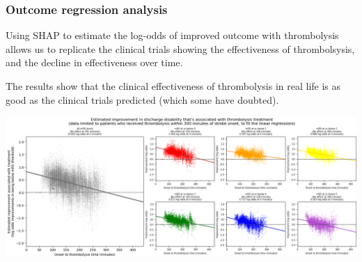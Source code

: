 \begin{frame}
\frametitle{Outcome regression analysis}

Using SHAP to estimate the log-odds of improved outcome with thrombolysis allows us to replicate the clinical trials showing the effectiveness of thrombolsysis, and the decline in effectiveness over time.

\vspace{2mm}

The results show that the clinical effectiveness of thrombolysis in real life is as good as the clinical trials predicted (which some have doubted).


\begin{center}
\includegraphics[width=1.01\textwidth]{./images_outcome/outcome_regression}
\end{center}


\end{frame}